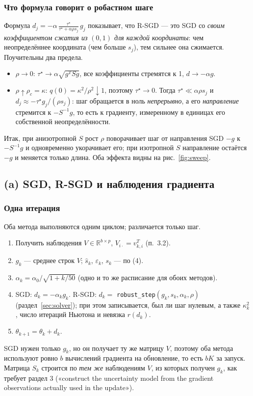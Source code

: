\documentclass[11pt,a4paper]{article}
\begin{document}
\subsubsection*{Что формула говорит о робастном шаге}

Формула $d_j=-\alpha\,\frac{\tau^\star}{\tau^\star+\alpha\rho s_j}\,g_j$ показывает, что
R-SGD — это SGD со \emph{своим коэффициентом сжатия из $(0,1)$ для каждой
координаты}: чем неопределённее координата (чем больше $s_j$), тем сильнее она сжимается.
Поучительны два предела.
\begin{itemize}
\item $\rho\to0$: $\tau^\star\to\alpha\sqrt{g^TSg}$, все коэффициенты стремятся к 1,
$d\to-\alpha g$.
\item $\rho\uparrow\rho_c=\kappa$: $q(0)=\kappa^2/\rho^2\downarrow1$, поэтому
$\tau^\star\to0$. Тогда $\tau^\star\ll\alpha\rho s_j$ и
$d_j\approx-\tau^\star g_j/(\rho s_j)$: шаг обращается в ноль \emph{непрерывно}, а его
\emph{направление} стремится к $-S^{-1}g$, то есть к градиенту, измеренному в единицах
его собственной неопределённости.
\end{itemize}
Итак, при анизотропной $S$ рост $\rho$ поворачивает шаг от направления SGD $-g$ к
$-S^{-1}g$ и одновременно укорачивает его; при изотропной $S$ направление остаётся $-g$
и меняется только длина. Оба эффекта видны на рис.~\ref{fig:sweep}.

\subsection{(a) SGD, R-SGD и наблюдения градиента}\label{sec:oracles}

\subsubsection*{Одна итерация}

Оба метода выполняются одним циклом; различается только шаг.
\begin{enumerate}
\item Получить наблюдения $V\in\mathbb R^{b\times p}$, $V_{i\cdot}=v_{k,i}^T$ (п.~3.2).
\item $g_k$ — среднее строк $V$; $\widehat s_k$, $\varepsilon_k$, $s_k$ — по (4).
\item $\alpha_k=\alpha_0/\sqrt{1+k/50}$ (одно и то же расписание для обоих методов).
\item SGD: $d_k=-\alpha_kg_k$. R-SGD: $d_k=$ \texttt{robust\_step}$(g_k,s_k,\alpha_k,\rho)$
(раздел~\ref{sec:solver}); при этом записывается, был ли шаг нулевым, а также $\kappa_k^2$, число итераций
Ньютона и невязка $r(d_k)$.
\item $\theta_{k+1}=\theta_k+d_k$.
\end{enumerate}
SGD нужен только $g_k$, но он получает ту же матрицу $V$, поэтому оба метода используют
ровно $b$ вычислений градиента на обновление, то есть $bK$ за запуск. Матрица $S_k$
строится по \emph{тем же} наблюдениям $V$, из которых получен $g_k$, как требует раздел 3
(«construct the uncertainty model from the gradient observations actually used in the
update»).
\end{document}
